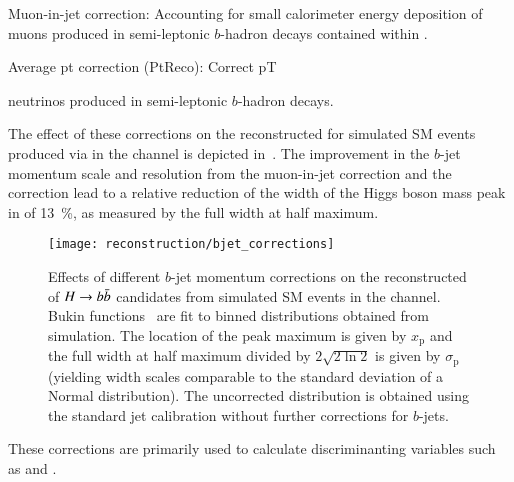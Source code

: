 Muon-in-jet correction: Accounting for small calorimeter energy
deposition of muons produced in semi-leptonic $b$-hadron decays
contained within .

Average pt correction (PtReco): Correct pT

neutrinos produced in semi-leptonic $b$-hadron decays.



The effect of these corrections on the reconstructed \mBB for
simulated SM \HH events produced via \ggF in the \hadhad channel is
depicted in~. The improvement in the
$b$-jet momentum scale and resolution from the muon-in-jet correction
and the \pTreco correction lead to a relative reduction of the width
of the Higgs boson mass peak in \mBB of \SI{13}{\percent}, as measured
by the full width at half maximum.

\begin{figure}[htbp]
  \centering

  \texttt{[image: reconstruction/bjet\_corrections]}

  \caption{Effects of different $b$-jet momentum corrections on the
    reconstructed \mBB of $H \to b\bar{b}$ candidates from simulated SM
    \HH events in the \hadhad channel. Bukin
    functions~\cite{Bukin:2007zha} are fit to binned distributions
    obtained from simulation. The location of the peak maximum is
    given by $x_{\text{p}}$ and the full width at half maximum divided
    by $2\sqrt{2 \ln 2}$ is given by $\sigma_{\text{p}}$ (yielding
    width scales comparable to the standard deviation of a Normal
    distribution). The uncorrected distribution is obtained using the
    standard jet calibration without further corrections for
    $b$-jets.}%
  \label{fig:bjet_momentum_corr_mbb}
\end{figure}

These corrections are primarily used to calculate discriminanting
variables such as \mBB and \dRtautau.



